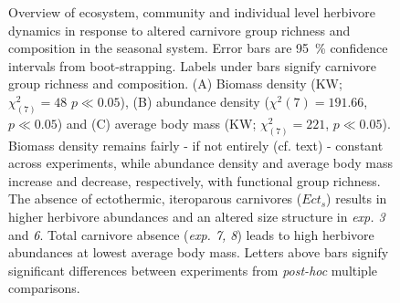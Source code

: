 \begin{figure}
\centering

\caption[Ecosystem, community and individual level response to altered carnivore group richness and composition in the seasonal system]{Overview of ecosystem, community and individual level herbivore dynamics in response to altered carnivore group richness and composition in the seasonal system. Error bars are 95~\% confidence intervals from boot-strapping. Labels under bars signify carnivore group richness and composition. (A) Biomass density (KW; $\chi^{2}_{(7)} = 48$ $p \ll 0.05$), (B) abundance density ($\chi^{2}(7) = 191.66$, $p \ll 0.05$) and (C) average body mass (KW; $\chi^{2}_{(7)} = 221$, $p \ll 0.05$). Biomass density remains fairly - if not entirely (cf. text) - constant across experiments, while abundance density and average body mass increase and decrease, respectively, with functional group richness. The absence of ectothermic, iteroparous carnivores ($Ect_s$) results in higher herbivore abundances and an altered size structure in \textit{exp. 3} and \textit{6}. Total carnivore absence (\textit{exp. 7, 8}) leads to high herbivore abundances at lowest average body mass. Letters above bars signify significant differences between experiments from \textit{post-hoc} multiple comparisons.}
\label{fig:chap:res:dyn:cell1}
\end{figure}




%
